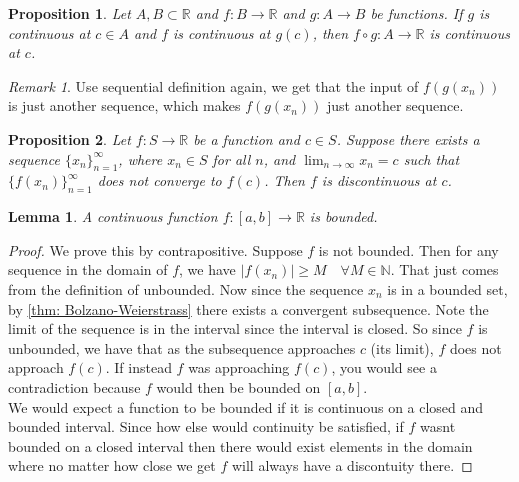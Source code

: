 \documentclass{article}
\newtheorem{lemma}{Lemma}[section]
\newtheorem{proposition}{Proposition}[section]
\theoremstyle{definition}
\theoremstyle{remark}
\newtheorem{remark}{Remark}[section]
\begin{document}
\vspace{.5cm}
\begin{proposition}
Let $A, B \subset \mathbb{R}$ and $f : B \to \mathbb{R}$ and $g : A \to B$ be functions. If $g$ is continuous at $c \in A$ and $f$ is continuous at $g(c)$, then $f \circ g: A \to \mathbb{R}$ is continuous at $c$.
\end{proposition}

\begin{remark}
Use sequential definition again, we get that the input of $f(g(x_n))$ is just another sequence, 
which makes $f(g(x_n))$ just another sequence.
\end{remark}


\vspace{.5cm}
\begin{proposition}
Let $f : S \to \mathbb{R}$ be a function and $c \in S$. Suppose there exists a sequence $\{x_n\}_{n=1}^{\infty}$, where $x_n \in S$ for all $n$, and $\lim_{n\to\infty} x_n = c$ such that $\{f(x_n)\}_{n=1}^{\infty}$ does not converge to $f(c)$. Then $f$ is discontinuous at $c$.
\end{proposition}


\vspace{.5cm}



\begin{lemma}\label{lem:cnts function is bounded}
A continuous function $f : [a,b] \to \mathbb{R}$ is bounded.
\end{lemma}


\begin{proof}
We prove this by contrapositive. 
Suppose $f$ is not bounded. 
Then for any sequence in the domain of $f$, we have 
$|f(x_n)|\geq M \quad \forall M \in \mathbb{N}$.
That just comes from the definition of unbounded. 
Now since the sequence $x_n$ is in a bounded set, 
by \ref{thm: Bolzano-Weierstrass}
there exists a convergent subsequence.
Note the limit of the sequence is in the interval 
since the interval is closed.
So since $f$ is unbounded, 
we have that as the subsequence approaches $c$ (its limit),
$f$ does not approach $f(c)$. 
If instead $f$ was approaching $f(c)$, you would see a contradiction 
because $f$ would then be bounded on $[a,b]$.\\
\indent We would expect a function to be bounded if it is continuous on a closed and bounded interval. Since
how else would continuity be satisfied, if $f$ wasnt bounded on a closed interval then 
there would exist elements in the domain where 
no matter how close we get $f$ will always have a discontuity there.
\end{proof}
\end{document}
